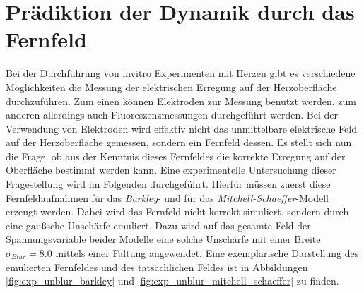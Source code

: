 \section{Prädiktion der Dynamik durch das Fernfeld}
\label{sec:exp_unblur}
Bei der Durchführung von invitro Experimenten mit Herzen gibt es verschiedene Möglichkeiten die Messung der elektrischen Erregung auf der Herzoberfläche durchzuführen. Zum einen können Elektroden zur Messung benutzt werden, zum anderen allerdings auch Fluoreszenzmessungen durchgeführt werden. Bei der Verwendung von Elektroden wird effektiv nicht das unmittelbare elektrische Feld auf der Herzoberfläche gemessen, sondern ein Fernfeld dessen. Es stellt sich nun die Frage, ob aus der Kenntnis dieses Fernfeldes die korrekte Erregung auf der Oberfläche bestimmt werden kann. Eine experimentelle Untersuchung dieser Fragestellung wird im Folgenden durchgeführt. Hierfür müssen zuerst diese Fernfeldaufnahmen für das \textit{Barkley}- und für das \textit{Mitchell-Schaeffer}-Modell erzeugt werden. Dabei wird das Fernfeld nicht korrekt simuliert, sondern durch eine gaußsche Unschärfe emuliert. Dazu wird auf das gesamte Feld der Spannungsvariable beider Modelle eine solche Unschärfe mit einer Breite $\sigma_{Blur} = 8.0$ mittels einer Faltung angewendet. Eine exemplarische Darstellung des emulierten Fernfeldes und des tatsächlichen Feldes ist in Abbildungen \ref{fig:exp_unblur_barkley} und \ref{fig:exp_unblur_mitchell_schaeffer} zu finden.

